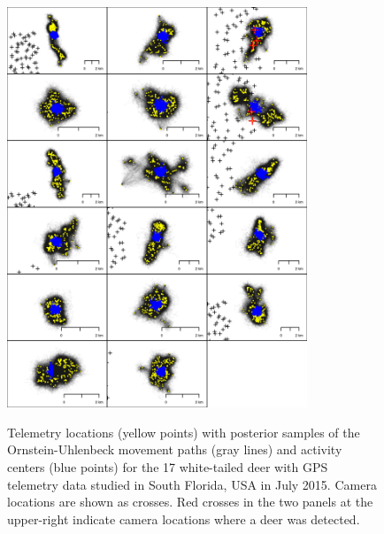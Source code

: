 \documentclass[12pt]{article}
\begin{document}
\begin{figure}[h!]
  \centering
  \includegraphics[width=0.8\textwidth]{figs/upost_panel} \\
  \caption{Telemetry locations (yellow points) with posterior samples
    of the Ornstein-Uhlenbeck movement paths (gray lines) and activity
    centers (blue points) for the 17 white-tailed deer with GPS
    telemetry data studied in South Florida, USA in July 2015. Camera
    locations are shown as crosses. Red crosses in the two panels at the
    upper-right indicate camera locations where a deer was detected. }  
  \label{fig:upost}
\end{figure}

\clearpage
\end{document}
